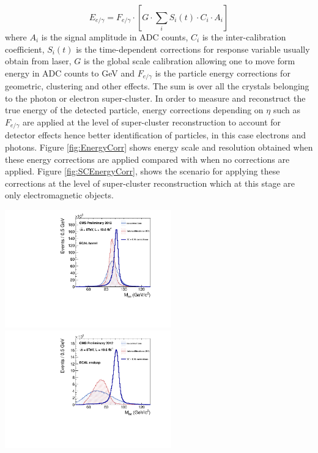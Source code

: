 \begin{equation}\label{eEnergy}
E_{e/\gamma} = F_{e/\gamma} \cdot [ G \cdot \sum_{i} S_{i}(t) \cdot C_{i} \cdot A_{i} ]
\end{equation}
where $A_{i}$ is the signal amplitude in ADC counts, $C_{i}$ is the inter-calibration coefficient,  $S_{i}(t)$ is the time-dependent corrections  for response variable usually obtain from laser, $G$ is the global scale calibration allowing one to move form energy in ADC counts to GeV and $F_{e/\gamma}$ is the particle energy corrections for geometric, clustering and other effects. The sum is over all the crystals belonging to the photon or electron super-cluster. In order to measure and reconstruct the true energy of the detected particle, energy corrections depending on $\eta$ such as $F_{e/\gamma}$ are applied at the level of super-cluster reconstruction to account for detector effects hence better identification of particles, in this case electrons and photons. Figure \ref{fig:EnergyCorr} shows energy scale and resolution obtained when these energy corrections are applied compared with when no corrections are applied. Figure \ref{fig:SCEnergyCorr}, shows the scenario for applying these corrections at the level of super-cluster reconstruction which at this stage are only electromagnetic objects.
\begin{center}
\centering
\mbox{\includegraphics[height=2.0in]{THESISPLOTS/propaganda_noIC_noLaser-regrCorr_ele-EB.pdf} \quad 
\includegraphics[height=2.0in]{THESISPLOTS/propaganda_noIC_noLaser-regrCorr_ele-EE.pdf} }
\label{fig:EnergyCorr}
\end{center}

